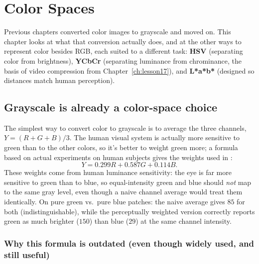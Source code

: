 \chapter{Color Spaces}
\label{ch:lesson18}

Previous chapters converted color images to grayscale and moved on. This chapter looks at what that conversion actually does, and at the other ways to represent color besides RGB, each suited to a different task: \textbf{HSV} (separating color from brightness), \textbf{YCbCr} (separating luminance from chrominance, the basis of video compression from Chapter~\ref{ch:lesson17}), and \textbf{L*a*b*} (designed so distances match human perception).

\section{Grayscale is already a color-space choice}

The simplest way to convert color to grayscale is to average the three channels, $Y=(R+G+B)/3$. The human visual system is actually more sensitive to green than to the other colors, so it's better to weight green more; a formula based on actual experiments on human subjects gives the weights used in :
\begin{equation}
Y = 0.299R + 0.587G + 0.114B.
\end{equation}
These weights come from human luminance sensitivity: the eye is far more sensitive to green than to blue, so equal-intensity green and blue should \emph{not} map to the same gray level, even though a naive channel average would treat them identically. On pure green vs.\ pure blue patches: the naive average gives $85$ for both (indistinguishable), while the perceptually weighted version correctly reports green as much brighter ($150$) than blue ($29$) at the same channel intensity.

\subsection*{Why this formula is outdated (even though widely used, and still useful)}

